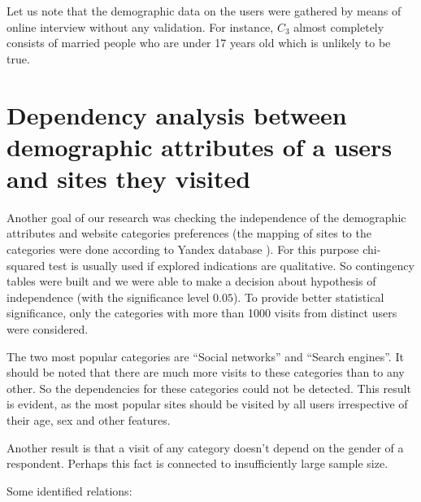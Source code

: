 \documentclass[runningheads,a4paper]{llncs}
\begin{document}
Let us note that the demographic data on the users were gathered by means of online interview without any validation. For instance, $C_3$ almost completely consists of married people who are under 17 years old which is unlikely to be true.


\section{Dependency analysis between demographic attributes of a users and sites they visited}



Another goal of our research was checking the independence of the demographic attributes and website categories preferences (the mapping of sites to the categories were done according to Yandex database \cite{yandex}). For this purpose chi-squared test is usually used if explored indications are qualitative. So contingency tables were built and we were able to make a decision about hypothesis of independence (with the significance level $0.05$). To provide better statistical significance, only the categories with more than 1000 visits from distinct users were considered.

The two most popular categories are ``Social networks'' and ``Search engines''. It should be noted that there are much more visits to these categories than to any other. So the dependencies for these categories could not be detected. This result is evident, as the most popular sites should be visited by all users irrespective of their age, sex and other features. 

Another result is that a visit of any category doesn’t depend on the gender of a respondent. Perhaps this fact is connected to insufficiently large sample size.

Some identified relations:
\end{document}
